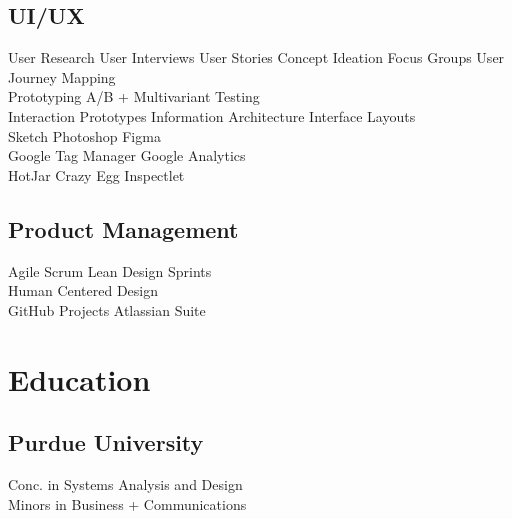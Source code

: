 \documentclass[]{deedy-resume-openfont}
\begin{document}
\begin{minipage}[t]{0.33\textwidth}
\subsection{UI/UX}
User Research \textbullet{} User Interviews \textbullet{} User Stories \textbullet{} Concept Ideation \textbullet{} Focus Groups \textbullet{} User Journey Mapping \\
Prototyping \textbullet{} A/B + Multivariant Testing  \\
\vspace{1pt}
Interaction Prototypes \textbullet{} Information Architecture \textbullet{} Interface Layouts \\
\vspace{1pt}
Sketch \textbullet{} Photoshop \textbullet{} Figma \\
Google Tag Manager \textbullet{} Google Analytics \\
HotJar \textbullet{} Crazy Egg \textbullet{} Inspectlet \\
\vspace{5pt}
\subsection{Product Management}
Agile \textbullet{} Scrum \textbullet{} Lean \textbullet{} Design Sprints \\
Human Centered Design \\
\vspace{1pt}
GitHub Projects \textbullet{} Atlassian Suite \\
\sectionsep


\section{Education}

\subsection{Purdue University}
Conc. in Systems Analysis and Design \\
Minors in Business + Communications \\
\sectionsep



\end{minipage}
\end{document}
